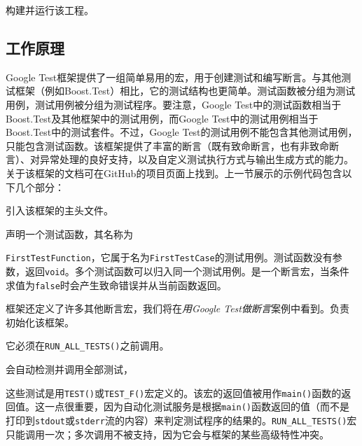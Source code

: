 
构建并运行该工程。



\subsection{工作原理}



Google Test框架提供了一组简单易用的宏，用于创建测试和编写断言。与其他测试框架（例如Boost.Test）相比，它的测试结构也更简单。测试函数被分组为测试用例，测试用例被分组为测试程序。要注意，Google Test中的测试函数相当于Boost.Test及其他框架中的测试用例，而Google Test中的测试用例相当于Boost.Test中的测试套件。不过，Google Test的测试用例不能包含其他测试用例，只能包含测试函数。该框架提供了丰富的断言（既有致命断言，也有非致命断言）、对异常处理的良好支持，以及自定义测试执行方式与输出生成方式的能力。关于该框架的文档可在GitHub的项目页面上找到。上一节展示的示例代码包含以下几个部分：



引入该框架的主头文件。



声明一个测试函数，其名称为



\texttt{FirstTestFunction}，它属于名为\texttt{FirstTestCase}的测试用例。测试函数没有参数，返回\texttt{void}。多个测试函数可以归入同一个测试用例。是一个断言宏，当条件求值为\texttt{false}时会产生致命错误并从当前函数返回。



框架还定义了许多其他断言宏，我们将在\textit{用Google Test做断言}案例中看到。负责初始化该框架。



它必须在\texttt{RUN\_\allowbreak{}ALL\_\allowbreak{}TESTS()}之前调用。



会自动检测并调用全部测试，



这些测试是用\texttt{TEST()}或\texttt{TEST\_\allowbreak{}F()}宏定义的。该宏的返回值被用作\texttt{main()}函数的返回值。这一点很重要，因为自动化测试服务是根据\texttt{main()}函数返回的值（而不是打印到\texttt{stdout}或\texttt{stderr}流的内容）来判定测试程序的结果的。\texttt{RUN\_\allowbreak{}ALL\_\allowbreak{}TESTS()}宏只能调用一次；多次调用不被支持，因为它会与框架的某些高级特性冲突。


